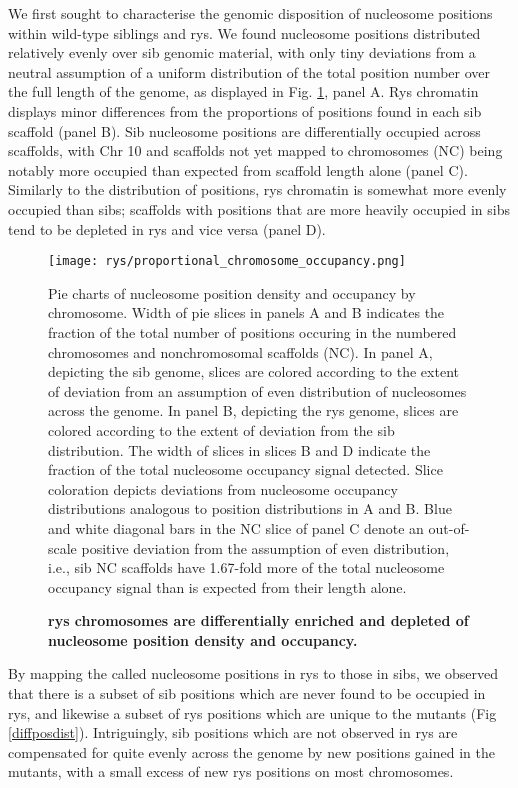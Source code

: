  We first sought to characterise the genomic disposition of nucleosome positions within wild-type siblings and rys. We found nucleosome positions distributed relatively evenly over sib genomic material, with only tiny deviations from a neutral assumption of a uniform distribution of the total position number over the full length of the genome, as displayed in Fig. \ref{nucgendist}, panel A. Rys chromatin displays minor differences from the proportions of positions found in each sib scaffold (panel B). Sib nucleosome positions are differentially occupied across scaffolds, with Chr 10 and scaffolds not yet mapped to chromosomes (NC) being notably more occupied than expected from scaffold length alone (panel C). Similarly to the distribution of positions, rys chromatin is somewhat more evenly occupied than sibs; scaffolds with positions that are more heavily occupied in sibs tend to be depleted in rys and vice versa (panel D). 

 \begin{figure}[!h]
\texttt{[image: rys/proportional\_chromosome\_occupancy.png]}
\caption{{\bf rys chromosomes are differentially enriched and depleted of nucleosome position density and occupancy.}}
Pie charts of nucleosome position density and occupancy by chromosome. Width of pie slices in panels A and B indicates the fraction of the total number of positions occuring in the numbered chromosomes and nonchromosomal scaffolds (NC). In panel A, depicting the sib genome, slices are colored according to the extent of deviation from an assumption of even distribution of nucleosomes across the genome. In panel B, depicting the rys genome, slices are colored according to the extent of deviation from the sib distribution. The width of slices in slices B and D indicate the fraction of the total nucleosome occupancy signal detected. Slice coloration depicts deviations from nucleosome occupancy distributions analogous to position distributions in A and B. Blue and white diagonal bars in the NC slice of panel C denote an out-of-scale positive deviation from the assumption of even distribution, i.e., sib NC scaffolds have 1.67-fold more of the total nucleosome occupancy signal than is expected from their length alone.  
\label{nucgendist}
\end{figure}

By mapping the called nucleosome positions in rys to those in sibs, we observed that there is a subset of sib positions which are never found to be occupied in rys, and likewise a subset of rys positions which are unique to the mutants (Fig \ref{diffposdist}). Intriguingly, sib positions which are not observed in rys are compensated for quite evenly across the genome by new positions gained in the mutants, with a small excess of new rys positions on most chromosomes.


